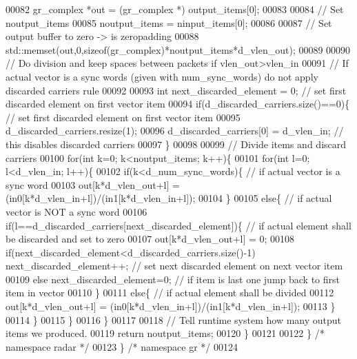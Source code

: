\begin{DoxyCode}
00082         gr\_complex *out = (gr\_complex *) output\_items[0];
00083 
00084         \textcolor{comment}{// Set noutput\_items}
00085         noutput\_items = ninput\_items[0];
00086         
00087         \textcolor{comment}{// Set output buffer to zero -> is zeropadding}
00088         std::memset(out,0,\textcolor{keyword}{sizeof}(gr\_complex)*noutput\_items*d_vlen_out);
00089         
00090         \textcolor{comment}{// Do division and keep spaces between packets if vlen\_out>vlen\_in}
00091         \textcolor{comment}{// If actual vector is a sync words (given with num\_sync\_words) do not apply discarded carriers
       rule}
00092         
00093         \textcolor{keywordtype}{int} next\_discarded\_element = 0; \textcolor{comment}{// set first discarded element on first vector item}
00094         \textcolor{keywordflow}{if}(d_discarded_carriers.size()==0)\{ \textcolor{comment}{// set first discarded element on first vector item}
00095             d_discarded_carriers.resize(1);
00096             d_discarded_carriers[0] = d_vlen_in; \textcolor{comment}{// this disables discarded carriers}
00097         \}
00098         
00099         \textcolor{comment}{// Divide items and discard carriers}
00100         \textcolor{keywordflow}{for}(\textcolor{keywordtype}{int} k=0; k<noutput\_items; k++)\{
00101             \textcolor{keywordflow}{for}(\textcolor{keywordtype}{int} l=0; l<d_vlen_in; l++)\{
00102                 \textcolor{keywordflow}{if}(k<d_num_sync_words)\{ \textcolor{comment}{// if actual vector is a sync word}
00103                     out[k*d\_vlen\_out+l] = (in0[k*d\_vlen\_in+l])/(in1[k*d\_vlen\_in+l]);
00104                 \}
00105                 \textcolor{keywordflow}{else}\{ \textcolor{comment}{// if actual vector is NOT a sync word}
00106                     \textcolor{keywordflow}{if}(l==d_discarded_carriers[next\_discarded\_element])\{ \textcolor{comment}{// if actual element shall be
       discarded and set to zero}
00107                         out[k*d\_vlen\_out+l] = 0;
00108                         \textcolor{keywordflow}{if}(next\_discarded\_element<d_discarded_carriers.size()-1) next\_discarded\_element++; \textcolor{comment}{
      // set next discarded element on next vector item}
00109                         \textcolor{keywordflow}{else} next\_discarded\_element=0; \textcolor{comment}{// if item is last one jump back to first item in
       vector}
00110                     \}
00111                     \textcolor{keywordflow}{else}\{ \textcolor{comment}{// if actual element shall be divided}
00112                         out[k*d\_vlen\_out+l] = (in0[k*d\_vlen\_in+l])/(in1[k*d\_vlen\_in+l]);
00113                     \}
00114                 \}
00115             \}
00116         \}
00117 
00118         \textcolor{comment}{// Tell runtime system how many output items we produced.}
00119         \textcolor{keywordflow}{return} noutput\_items;
00120     \}
00121 
00122   \} \textcolor{comment}{/* namespace radar */}
00123 \} \textcolor{comment}{/* namespace gr */}
00124 
\end{DoxyCode}
